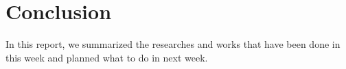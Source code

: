 \section{Conclusion}
\label{sec:conclusion}
In this report, we summarized the researches and works that have been done in this week and planned what to do in next week.